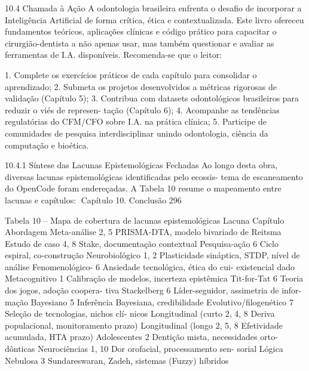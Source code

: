 10.4      Chamada à Ação
A odontologia brasileira enfrenta o desafio de incorporar a Inteligência Artificial de forma
crítica, ética e contextualizada. Este livro ofereceu fundamentos teóricos, aplicações
clínicas e código prático para capacitar o cirurgião-dentista a não apenas usar, mas
também questionar e avaliar as ferramentas de I.A. disponíveis.
         Recomenda-se que o leitor:

  1. Complete os exercícios práticos de cada capítulo para consolidar o aprendizado;
  2. Submeta os projetos desenvolvidos a métricas rigorosas de validação (Capítulo 5);
  3. Contribua com datasets odontológicos brasileiros para reduzir o viés de represen-
     tação (Capítulo 6);
  4. Acompanhe as tendências regulatórias do CFM/CFO sobre I.A. na prática clínica;
  5. Participe de comunidades de pesquisa interdisciplinar unindo odontologia, ciência
     da computação e bioética.

10.4.1     Síntese das Lacunas Epistemológicas Fechadas
Ao longo desta obra, diversas lacunas epistemológicas identificadas pelo ecossis-
tema de escaneamento do OpenCode foram endereçadas. A Tabela 10 resume o
mapeamento entre lacunas e capítulos:
Capítulo 10. Conclusão                                                                  296


                Tabela 10 – Mapa de cobertura de lacunas epistemológicas
      Lacuna                   Capítulo          Abordagem
      Meta-análise             2, 5              PRISMA-DTA, modelo bivariado de
                                                 Reitsma
      Estudo de caso           4, 8              Stake, documentação contextual
      Pesquisa-ação            6                 Ciclo espiral, co-construção
      Neurobiológico           1, 2              Plasticidade sináptica, STDP, nível
                                                 de análise
      Fenomenológico-          6                 Ansiedade tecnológica, ética do cui-
      existencial                                dado
      Metacognitivo            1                 Calibração de modelos, incerteza
                                                 epistêmica
      Tit-for-Tat              6                 Teoria dos jogos, adoção coopera-
                                                 tiva
      Stackelberg              6                 Líder-seguidor, assimetria de infor-
                                                 mação
      Bayesiano                5                 Inferência Bayesiana, credibilidade
      Evolutivo/filogenético   7                 Seleção de tecnologias, nichos clí-
                                                 nicos
      Longitudinal (curto      2, 4, 8           Deriva populacional, monitoramento
      prazo)
      Longitudinal (longo      2, 5, 8           Efetividade acumulada, HTA
      prazo)
      Adolescentes             2                 Dentição mista, necessidades orto-
                                                 dônticas
      Neurociências            1, 10             Dor orofacial, processamento sen-
                                                 sorial
      Lógica        Nebulosa   3                 Sundareswaran, Zadeh, sistemas
      (Fuzzy)                                    híbridos


